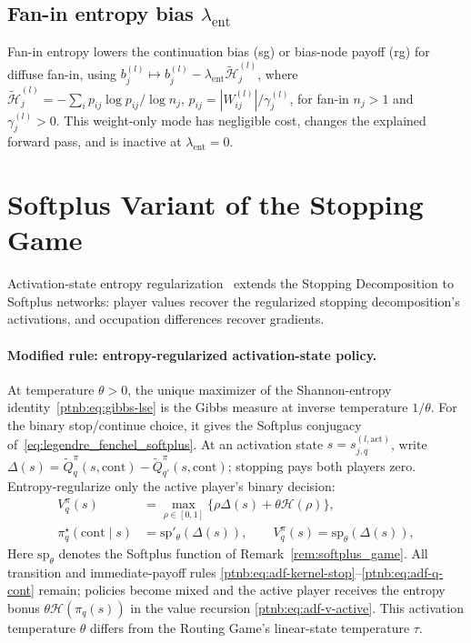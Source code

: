 \subsection{\texorpdfstring{Fan-in entropy bias $\lambda_{\mathrm{ent}}$}{Fan-in entropy bias lambda\_ent}}\label{ptnb:app:entropy-mode}

Fan-in entropy lowers the continuation bias (\ac{sg}) or bias-node payoff (\ac{rg}) for diffuse
fan-in, using $b_j^{(l)}\mapsto b_j^{(l)}-\lambda_{\mathrm{ent}}\tilde{\mathcal H}_j^{(l)}$, where
$\tilde{\mathcal H}_j^{(l)}=-\sum_i p_{ij}\log p_{ij}/\log n_j$,
$p_{ij}=|W_{ij}^{(l)}|/\gamma_j^{(l)}$, for fan-in $n_j>1$ and $\gamma_j^{(l)}>0$. This weight-only mode has negligible
cost, changes the explained forward pass, and is inactive at $\lambda_{\mathrm{ent}}=0$.

\section{Softplus Variant of the Stopping Game}\label{ptnb:app:softplus-stopping-game}

Activation-state entropy regularization~\parencite{Gaubert2025} extends the Stopping Decomposition
to Softplus networks: player values recover the regularized stopping decomposition's activations, and occupation differences recover
gradients.

\paragraph{Modified rule: entropy-regularized activation-state policy.}\label{ptnb:app:softplus-rules}
At temperature $\theta>0$, the unique maximizer of the Shannon-entropy identity~\eqref{ptnb:eq:gibbs-lse} is the Gibbs measure at inverse temperature $1/\theta$. For the binary stop/continue choice, it gives the Softplus
conjugacy of~\eqref{eq:legendre_fenchel_softplus}.
At an activation state $s=s_{j,q}^{(l,\mathrm{act})}$, write
$\Delta(s)=\tilde Q_q^\pi(s,\mathrm{cont})-\tilde Q_{q'}^\pi(s,\mathrm{cont})$; stopping pays both
players zero. Entropy-regularize only the active player's binary decision:
\begin{align}
    V_q^\pi(s)&=\max_{\rho\in[0,1]}\{\rho\Delta(s)+\theta\mathcal H(\rho)\},\label{ptnb:eq:softplus-soft-bellman}\\
    \pi_q^\star(\mathrm{cont}\mid s)&=\mathrm{sp}'_\theta(\Delta(s)),\qquad
    V_q^\pi(s)=\mathrm{sp}_\theta(\Delta(s)),\label{ptnb:eq:softplus-policy}
\end{align}
Here $\mathrm{sp}_\theta$ denotes the Softplus function of Remark~\ref{rem:softplus_game}. All transition and immediate-payoff rules
\eqref{ptnb:eq:adf-kernel-stop}--\eqref{ptnb:eq:adf-q-cont} remain; policies become mixed and the
active player receives the entropy bonus $\theta\mathcal H(\pi_q(s))$ in the value recursion
\eqref{ptnb:eq:adf-v-active}. This activation temperature $\theta$ differs from the Routing Game's
linear-state temperature $\tau$.

